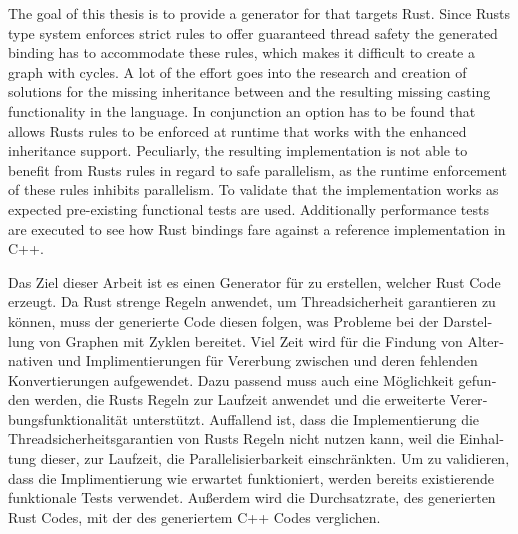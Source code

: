\documentclass[thesis]{subfiles}
\begin{document}
{
\let\cleardoublepage\relax

The goal of this thesis is to provide a generator for  that targets Rust.
Since Rusts type system enforces strict rules to offer guaranteed thread safety the generated binding has to accommodate these rules, which makes it difficult to create a graph with cycles.
A lot of the effort goes into the research and creation of solutions for the missing inheritance between \structs and the resulting missing casting functionality in the language.
In conjunction an option has to be found that allows Rusts rules to be enforced at runtime that works with the enhanced inheritance support.
Peculiarly, the resulting implementation is not able to benefit from Rusts rules in regard to safe parallelism, as the runtime enforcement of these rules inhibits parallelism.
To validate that the implementation works as expected pre-existing functional tests are used.
Additionally performance tests are executed to see how Rust bindings fare against a reference implementation in C++.

}

\begin{otherlanguage}{ngerman}
  Das Ziel dieser Arbeit ist es einen Generator für  zu erstellen, welcher Rust Code erzeugt.
  Da Rust strenge Regeln anwendet, um Threadsicherheit garantieren zu können, muss der generierte Code diesen folgen, was Probleme bei der Darstellung von Graphen mit Zyklen bereitet.
  Viel Zeit wird für die Findung von Alternativen und Implimentierungen für Vererbung zwischen \structs und deren fehlenden Konvertierungen aufgewendet.
  Dazu passend muss auch eine Möglichkeit gefunden werden, die Rusts Regeln zur Laufzeit anwendet und die erweiterte Vererbungsfunktionalität unterstützt.
  Auffallend ist, dass die Implementierung die Threadsicherheitsgarantien von Rusts Regeln  nicht nutzen kann, weil die Einhaltung dieser, zur Laufzeit, die Parallelisierbarkeit einschränkten.
  Um zu validieren, dass die Implimentierung wie erwartet funktioniert, werden bereits existierende funktionale Tests verwendet.
  Außerdem wird die Durchsatzrate, des generierten Rust Codes, mit der des generiertem C++ Codes verglichen.
\end{otherlanguage}
\end{document}
